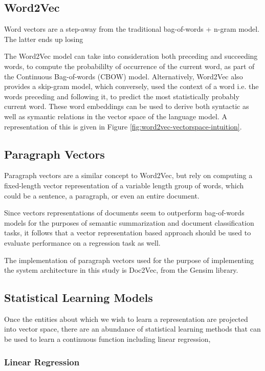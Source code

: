 \documentclass[conference]{IEEEtran}
\begin{document}
\subsection{Word2Vec} \label{Word2Vec}
Word vectors are a step-away from the traditional bag-of-words + n-gram model. The latter ends up losing

The Word2Vec model\cite{mikolov2013efficient} can take into consideration both preceding and succeeding words, to compute the probabililty of occurrence of the current word, as part of the Continuous Bag-of-words (CBOW) model. Alternatively, Word2Vec also provides a skip-gram model\cite{mikolov2013distributed}, which conversely, used the context of a word i.e. the words preceding and following it, to predict the most statistically probably current word. These word embeddings can be used to derive both syntactic as well as symantic relations in the vector space of the language model. A representation of this is given in Figure \ref{fig:word2vec-vectorspace-intuition}.

\subsection{Paragraph Vectors}
Paragraph vectors are a similar concept to Word2Vec, but rely on computing a fixed-length vector representation of a variable length group of words, which could be a sentence, a paragraph, or even an entire document.

Since vectors representations of documents seem to outperform bag-of-words models for the purposes of semantic summarization and document classification tasks\cite{le2014distributed}, it follows that a vector representation based approach should be used to evaluate performance on a regression task as well.

The implementation of paragraph vectors used for the purpose of implementing the system architecture in this study is Doc2Vec, from the Gensim library\cite{doc2vec_api}.

\subsection{Statistical Learning Models}
Once the entities about which we wish to learn a representation are projected into vector space, there are an abundance of statistical learning methods that can be used to learn a continuous function including linear regression, 

\subsubsection{Linear Regression}
\end{document}
